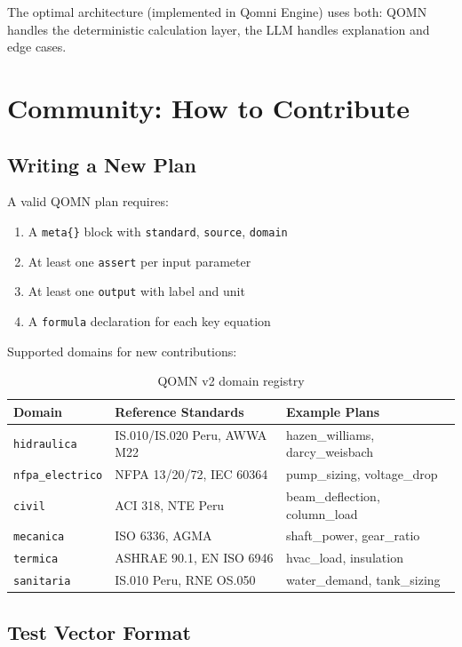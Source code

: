\documentclass[12pt,a4paper]{article}
\begin{document}
The optimal architecture (implemented in Qomni Engine) uses both:
QOMN handles the deterministic calculation layer, the LLM handles
explanation and edge cases.

\section{Community: How to Contribute}

\subsection{Writing a New Plan}

A valid QOMN plan requires:
\begin{enumerate}
  \item A \texttt{meta\{\}} block with \texttt{standard}, \texttt{source}, \texttt{domain}
  \item At least one \texttt{assert} per input parameter
  \item At least one \texttt{output} with label and unit
  \item A \texttt{formula} declaration for each key equation
\end{enumerate}

Supported domains for new contributions:

\begin{table}[h]
\centering
\caption{QOMN v2 domain registry}
\begin{tabular}{lll}
\toprule
Domain & Reference Standards & Example Plans \\
\midrule
\texttt{hidraulica} & IS.010/IS.020 Peru, AWWA M22 & hazen\_williams, darcy\_weisbach \\
\texttt{nfpa\_electrico} & NFPA 13/20/72, IEC 60364 & pump\_sizing, voltage\_drop \\
\texttt{civil} & ACI 318, NTE Peru & beam\_deflection, column\_load \\
\texttt{mecanica} & ISO 6336, AGMA & shaft\_power, gear\_ratio \\
\texttt{termica} & ASHRAE 90.1, EN ISO 6946 & hvac\_load, insulation \\
\texttt{sanitaria} & IS.010 Peru, RNE OS.050 & water\_demand, tank\_sizing \\
\bottomrule
\end{tabular}
\end{table}

\subsection{Test Vector Format}
\end{document}

